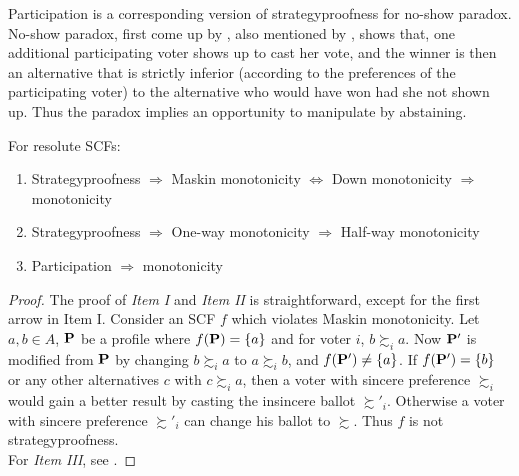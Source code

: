 Participation is a corresponding version of strategyproofness for no-show paradox. No-show paradox, first come up by \textcite{fishburn_paradoxes_1983}, also mentioned by \textcite{sanver_one-way_2009}, shows that, one additional participating voter shows up to cast her vote, and the winner is then an alternative that is strictly inferior (according to the preferences of the participating voter) to the alternative who would have won had she not shown up. Thus the paradox implies an opportunity to manipulate by abstaining.

\begin{proposition}
    For resolute SCFs:
    \begin{enumerate}
        \item Strategyproofness $\Rightarrow$ Maskin monotonicity $\Leftrightarrow$ Down monotonicity $\Rightarrow$ monotonicity
        \item Strategyproofness $\Rightarrow$ One-way monotonicity $\Rightarrow$ Half-way monotonicity
        \item Participation $\Rightarrow$ monotonicity
    \end{enumerate}
\end{proposition}

\begin{proof}
    The proof of \textit{Item I} and \textit{Item II} is straightforward, except for the first arrow in Item I. Consider an SCF $f$ which violates Maskin monotonicity. Let $a, b \in A$, $\mathbf{P}$ be a profile where $f(\mathbf{P}) = \{a\}$ and for voter $i$, $b \succsim_i a$. Now $\mathbf{P}'$ is modified from $\mathbf{P}$ by changing $b \succsim_i a$ to $a \succsim_i b$, and $f(\mathbf{P}') \neq \{a\}$. 
    If $f(\mathbf{P}') = \{b\}$ or any other alternatives $c$ with $c \succsim_i a$, then a voter with sincere preference $\succsim_i$ would gain a better result by casting the insincere ballot $\succsim'_i$. Otherwise a voter with sincere preference $\succsim'_i$ can change his ballot to $\succsim$. Thus $f$ is not strategyproofness.\\
    For \textit{Item III}, see \textcite{sanver_one-way_2009}. 
\end{proof}